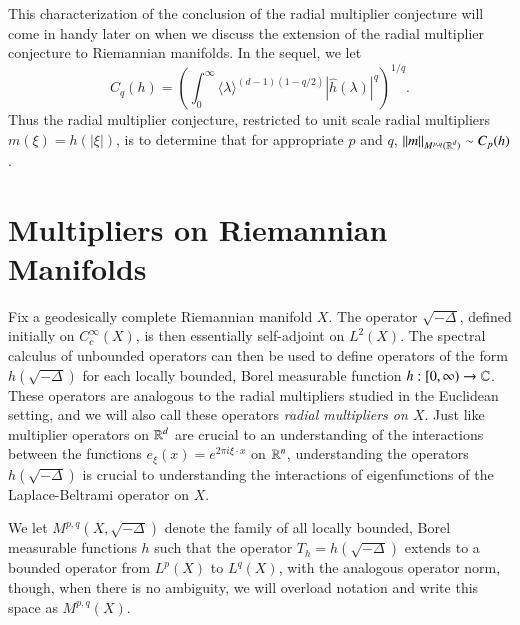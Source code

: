 This characterization of the conclusion of the radial multiplier conjecture will come in handy later on when we discuss the extension of the radial multiplier conjecture to Riemannian manifolds. In the sequel, we let
%
\[ C_q(h) = \left( \int_0^\infty \langle \lambda \rangle^{(d-1)(1 - q/2)} |\widehat{h}(\lambda)|^q \right)^{1/q}. \]
%
Thus the radial multiplier conjecture, restricted to unit scale radial multipliers $m(\xi) = h(|\xi|)$, is to determine that for appropriate $p$ and $q$, $\| m \|_{M^{p,q}(\operatorname{\mathbb{R}}^d)} \sim C_p(h)$.

\section{Multipliers on Riemannian Manifolds}

Fix a geodesically complete Riemannian manifold $X$. The operator $\sqrt{-\Delta}$, defined initially on $C_c^\infty(X)$, is then essentially self-adjoint on $L^2(X)$. The spectral calculus of unbounded operators can then be used to define operators of the form $h(\sqrt{-\Delta})$ for each locally bounded, Borel measurable function $h: [0,\infty) \to \operatorname{\mathbb{C}}$. These operators are analogous to the radial multipliers studied in the Euclidean setting, and we will also call these operators \emph{radial multipliers on $X$}. Just like multiplier operators on $\operatorname{\mathbb{R}}^d$ are crucial to an understanding of the interactions between the functions $e_\xi(x) = e^{2 \pi i \xi \cdot x}$ on $\operatorname{\mathbb{R}}^n$, understanding the operators $h(\sqrt{-\Delta})$ is crucial to understanding the interactions of eigenfunctions of the Laplace-Beltrami operator on $X$.

We let $M^{p,q}(X, \sqrt{-\Delta} )$ denote the family of all locally bounded, Borel measurable functions $h$ such that the operator $T_h = h(\sqrt{-\Delta})$ extends to a bounded operator from $L^p(X)$ to $L^q(X)$, with the analogous operator norm, though, when there is no ambiguity, we will overload notation and write this space as $M^{p,q}(X)$.


